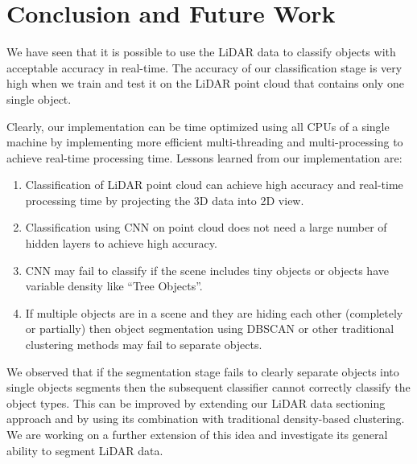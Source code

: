 \section{Conclusion and Future Work}\label{sec:conclusion}
We have seen that it is possible to use the LiDAR data to classify objects with acceptable accuracy in real-time.
The accuracy of our classification stage is very high when we train and test it on the LiDAR point cloud that contains only one single object.


Clearly, our implementation can be time optimized using all CPUs of a single machine by implementing more efficient multi-threading 
and multi-processing to achieve real-time processing time.  Lessons learned from our implementation are:
\begin{enumerate}
  \item Classification of LiDAR point cloud can achieve high accuracy and real-time processing time by projecting the 3D data into 2D view.
  \item Classification using CNN on point cloud does not need a large number of hidden layers to achieve high accuracy.
  \item CNN may fail to classify if the scene includes tiny objects or objects have variable density like ``Tree Objects''.
  \item If multiple objects are in a scene and they are hiding each other (completely or partially) then object segmentation using DBSCAN 
  or other traditional clustering methods may fail to separate objects.
\end{enumerate}

We observed that if the segmentation stage fails to clearly separate objects into single objects segments then the subsequent classifier cannot correctly classify the object types. This can be improved by extending our LiDAR data sectioning approach and by using its combination with traditional density-based clustering. We are working on a further extension of this idea and investigate its general ability to segment LiDAR data.  

